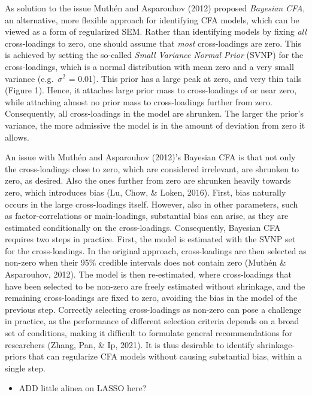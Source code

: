 \documentclass[
  man, donotrepeattitle,floatsintext]{apa6}
\providecommand{\tightlist}{%
  \setlength{\itemsep}{0pt}\setlength{\parskip}{0pt}}
\begin{document}
As solution to the issue Muthén and Asparouhov (2012) proposed \emph{Bayesian CFA}, an alternative, more flexible approach for identifying CFA models, which can be viewed as a form of regularized SEM. Rather than identifying models by fixing \emph{all} cross-loadings to zero, one should assume that \emph{most} cross-loadings are zero. This is achieved by setting the so-called \emph{Small Variance Normal Prior} (SVNP) for the cross-loadings, which is a normal distribution with mean zero and a very small variance (e.g.~\(\sigma^2\) = 0.01). This prior has a large peak at zero, and very thin tails (Figure 1). Hence, it attaches large prior mass to cross-loadings of or near zero, while attaching almost no prior mass to cross-loadings further from zero. Consequently, all cross-loadings in the model are shrunken. The larger the prior's variance, the more admissive the model is in the amount of deviation from zero it allows.

An issue with Muthén and Asparouhov (2012)'s Bayesian CFA is that not only the cross-loadings close to zero, which are considered irrelevant, are shrunken to zero, as desired. Also the ones further from zero are shrunken heavily towards zero, which introduces bias (Lu, Chow, \& Loken, 2016). First, bias naturally occurs in the large cross-loadings itself. However, also in other parameters, such as factor-correlations or main-loadings, substantial bias can arise, as they are estimated conditionally on the cross-loadings. Consequently, Bayesian CFA requires two steps in practice. First, the model is estimated with the SVNP set for the cross-loadings. In the original approach, cross-loadings are then selected as non-zero when their 95\% credible intervals does not contain zero (Muthén \& Asparouhov, 2012). The model is then re-estimated, where cross-loadings that have been selected to be non-zero are freely estimated without shrinkage, and the remaining cross-loadings are fixed to zero, avoiding the bias in the model of the previous step. Correctly selecting cross-loadings as non-zero can pose a challenge in practice, as the performance of different selection criteria depends on a broad set of conditions, making it difficult to formulate general recommendations for researchers (Zhang, Pan, \& Ip, 2021). It is thus desirable to identify shrinkage-priors that can regularize CFA models without causing substantial bias, within a single step.

\begin{itemize}
\tightlist
\item
  ADD little alinea on LASSO here?
\end{itemize}
\end{document}
